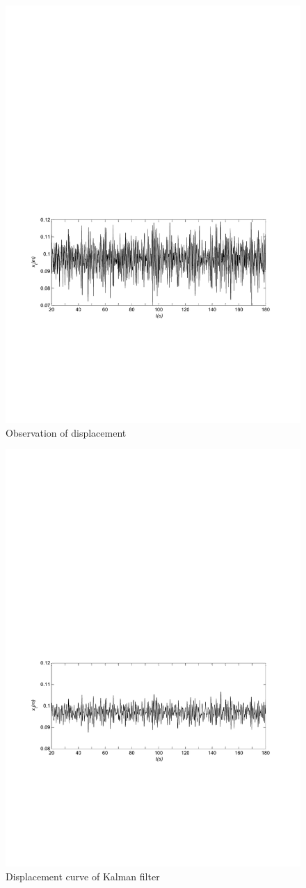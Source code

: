 \documentclass{article}
\begin{document}
\begin{figure}[H]
  \centering
  \includegraphics[width=0.8\hsize]{MATLAB-observer.pdf}
  \caption{Observation of displacement}
  \label{fig:observe}
\end{figure}

\begin{figure}[H]
  \centering
  \includegraphics[width=0.8\hsize]{MATLAB-kalman.pdf}
  \caption{Displacement curve of Kalman filter}
  \label{fig:kalman}
\end{figure}
\end{document}
